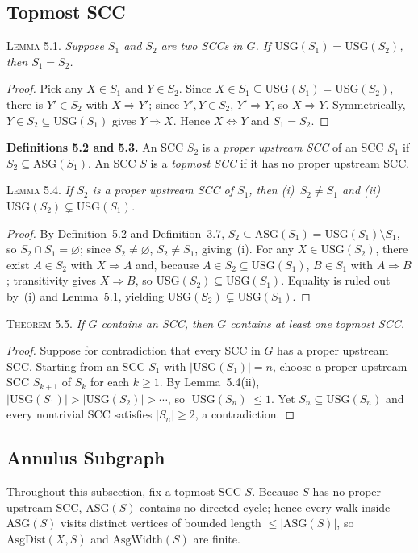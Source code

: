 \documentclass[sigconf,nonacm]{acmart}
\newcommand{\usg}{\mathrm{USG}}
\newcommand{\asg}{\mathrm{ASG}}
\newcommand{\asgdist}{\mathrm{AsgDist}}
\newcommand{\asgwidth}{\mathrm{AsgWidth}}
\newcommand{\phead}[1]{\par\noindent\textsc{#1.}\enspace}
\begin{document}
\subsection{Topmost SCC}
\label{sec:topmost}
\phead{Lemma 5.1}%
\emph{Suppose \(S_1\) and \(S_2\) are two SCCs in \(G\). If
\(\usg(S_1)=\usg(S_2)\), then \(S_1=S_2\).}
\begin{proof}
Pick any \(X\in S_1\) and \(Y\in S_2\). Since
\(X\in S_1\subseteq\usg(S_1)=\usg(S_2)\), there is \(Y'\in S_2\) with
\(X\Rightarrow Y'\); since \(Y',Y\in S_2\), \(Y'\Rightarrow Y\), so
\(X\Rightarrow Y\). Symmetrically, \(Y\in S_2\subseteq\usg(S_1)\) gives
\(Y\Rightarrow X\). Hence \(X\Leftrightarrow Y\) and \(S_1=S_2\).
\end{proof}

\noindent\textbf{Definitions 5.2 and 5.3.}\enspace
An SCC \(S_2\) is a \emph{proper upstream SCC} of an SCC \(S_1\) if
\(S_2\subseteq\asg(S_1)\). An SCC \(S\) is a \emph{topmost SCC} if it
has no proper upstream SCC.

\phead{Lemma 5.4}%
\emph{If \(S_2\) is a proper upstream SCC of \(S_1\), then
(i)~\(S_2\neq S_1\) and (ii)~\(\usg(S_2)\subsetneq\usg(S_1)\).}
\begin{proof}
By Definition~5.2 and Definition~3.7,
\(S_2\subseteq\asg(S_1)=\usg(S_1)\setminus S_1\), so
\(S_2\cap S_1=\varnothing\); since \(S_2\neq\varnothing\),
\(S_2\neq S_1\), giving~(i). For any \(X\in\usg(S_2)\), there exist
\(A\in S_2\) with \(X\Rightarrow A\) and, because
\(A\in S_2\subseteq\usg(S_1)\), \(B\in S_1\) with \(A\Rightarrow B\);
transitivity gives \(X\Rightarrow B\), so
\(\usg(S_2)\subseteq\usg(S_1)\). Equality is ruled out by~(i) and
Lemma~5.1, yielding \(\usg(S_2)\subsetneq\usg(S_1)\).
\end{proof}

\phead{Theorem 5.5}%
\emph{If \(G\) contains an SCC, then \(G\) contains at least one topmost
SCC.}
\begin{proof}
Suppose for contradiction that every SCC in \(G\) has a proper upstream
SCC. Starting from an SCC \(S_1\) with \(|\usg(S_1)|=n\), choose a
proper upstream SCC \(S_{k+1}\) of \(S_k\) for each \(k\ge 1\). By
Lemma~5.4(ii), \(|\usg(S_1)|>|\usg(S_2)|>\cdots\), so
\(|\usg(S_n)|\le 1\). Yet \(S_n\subseteq\usg(S_n)\) and every nontrivial
SCC satisfies \(|S_n|\ge 2\), a contradiction.
\end{proof}

\subsection{Annulus Subgraph}
\label{sec:annulus}
Throughout this subsection, fix a topmost SCC \(S\). Because \(S\) has
no proper upstream SCC, \(\asg(S)\) contains no directed cycle; hence
every walk inside \(\asg(S)\) visits distinct vertices of bounded length
\(\le |\asg(S)|\), so \(\asgdist(X,S)\) and \(\asgwidth(S)\) are finite.
\end{document}
